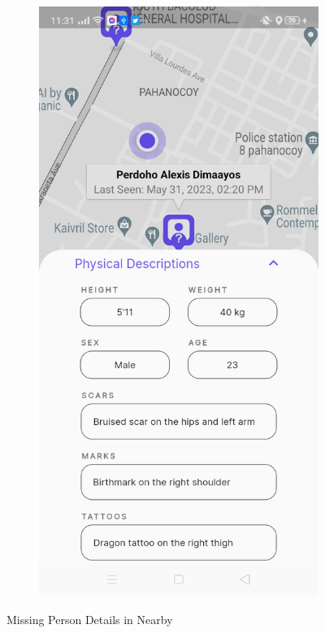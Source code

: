 \begin{figure}[!h]
\begin{subfigure}[c]{0.30\linewidth}
    \end{subfigure}
    \centering
    \begin{subfigure}[c]{0.30\linewidth}
        \centering
        \includegraphics[scale=0.15]{figures/Chapter4/Main/NearbyMP-3.jpg}
    \end{subfigure}
    \caption{Missing Person Details in Nearby}
    \label{fig:notifications}
\end{figure}

